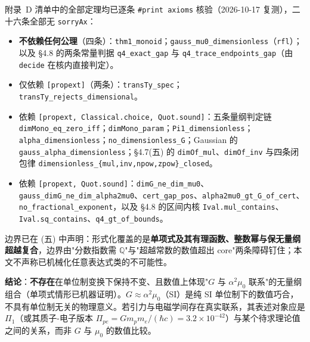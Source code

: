 \documentclass[12pt,a4paper]{article}
\begin{document}
\noindent 附录~D 清单中的全部定理均已逐条 \texttt{\#print axioms} 核验（2026-10-17 复测），二十六条全部无 \texttt{sorryAx}：
\begin{itemize}
  \item \textbf{不依赖任何公理}（四条）：\texttt{thm1\_\allowbreak{}monoid}；\texttt{gauss\_\allowbreak{}mu0\_\allowbreak{}dimensionless}（\texttt{rfl}）；以及 \S4.8 的两条常量判据 \texttt{q4\_\allowbreak{}exact\_\allowbreak{}gap} 与 \texttt{q4\_\allowbreak{}trace\_\allowbreak{}endpoints\_\allowbreak{}gap}（由 \texttt{decide} 在核内直接判定）。
  \item 仅依赖 \texttt{[propext]}（两条）：\texttt{transTy\_\allowbreak{}spec}；\texttt{transTy\_\allowbreak{}rejects\_\allowbreak{}dimensional}。
  \item 依赖 \texttt{[propext, Classical.choice, Quot.sound]}：五条量纲判定链 \texttt{dimMono\_\allowbreak{}eq\_\allowbreak{}zero\_\allowbreak{}iff}；\texttt{dimMono\_\allowbreak{}param}；\texttt{Pi1\_\allowbreak{}dimensionless}；\texttt{alpha\_\allowbreak{}dimensionless}；\texttt{no\_\allowbreak{}dimensionless\_\allowbreak{}G}；Gaussian 的 \texttt{gauss\_\allowbreak{}alpha\_\allowbreak{}dimensionless}；\S4.7(五) 的 \texttt{dimOf\_\allowbreak{}mul}、\texttt{dimOf\_\allowbreak{}inv} 与四条闭包律 \texttt{dimensionless\_\allowbreak{}\{mul,inv,npow,zpow\}\_\allowbreak{}closed}。
  \item 依赖 \texttt{[propext, Quot.sound]}：\texttt{dimG\_\allowbreak{}ne\_\allowbreak{}dim\_\allowbreak{}mu0}、\texttt{gauss\_\allowbreak{}dimG\_\allowbreak{}ne\_\allowbreak{}dim\_\allowbreak{}alpha2mu0}、\texttt{cert\_\allowbreak{}gap\_\allowbreak{}pos}、\texttt{alpha2mu0\_\allowbreak{}gt\_\allowbreak{}G\_\allowbreak{}of\_\allowbreak{}cert}、\texttt{no\_\allowbreak{}fractional\_\allowbreak{}exponent}，以及 \S4.8 的区间内核 \texttt{Ival.mul\_\allowbreak{}contains}、\texttt{Ival.sq\_\allowbreak{}contains}、\texttt{q4\_\allowbreak{}gt\_\allowbreak{}of\_\allowbreak{}bounds}。
\end{itemize}
\noindent 边界已在 (五) 中声明：形式化覆盖的是\textbf{单项式及其有理函数、整数幂与保无量纲超越复合}，边界由"分数指数需 $\mathbb{Q}$"与"超越常数的数值超出 core"两条障碍钉住；本文不声称已机械化任意表达式类的不可能性。

\textbf{结论}：\textbf{不存在}在单位制变换下保持不变、且数值上体现"$G$ 与 $\alpha^2\mu_0$ 联系"的无量纲组合（单项式情形已机器证明）。$G \approx \alpha^2\mu_0$（SI）是纯 SI 单位制下的数值巧合，不具有单位制无关的物理意义。若引力与电磁学间存在真实联系，其表述对象应是 $\Pi_1$（或其质子-电子版本 $\Pi_{pe} = Gm_pm_e/(\hbar c) = 3.2\times10^{-42}$）与某个待求理论值之间的关系，而非 $G$ 与 $\mu_0$ 的数值比较。
\end{document}
